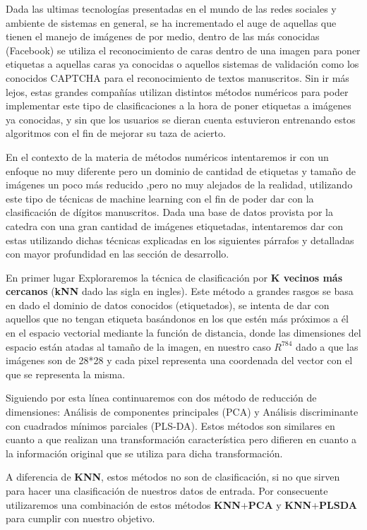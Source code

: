 Dada las ultimas tecnologías presentadas en el mundo de las redes sociales y ambiente de sistemas en general, se ha incrementado el auge de aquellas que tienen el manejo de imágenes de por medio, dentro de las más conocidas (Facebook) se utiliza el reconocimiento de caras dentro de una imagen para poner etiquetas a aquellas caras ya conocidas o aquellos sistemas de validación como los conocidos CAPTCHA para el reconocimiento de textos manuscritos. Sin ir más lejos, estas grandes compañías utilizan distintos métodos numéricos para poder implementar este tipo de clasificaciones a la hora de poner etiquetas a imágenes ya conocidas, y sin que los usuarios se dieran cuenta estuvieron entrenando estos algoritmos con el fin de mejorar su taza de acierto. 

En el contexto de la materia de métodos numéricos intentaremos ir con un enfoque no muy diferente pero un dominio de cantidad de etiquetas y tamaño de imágenes un poco más reducido ,pero no muy alejados de la realidad, utilizando este tipo de técnicas de machine learning con el fin de poder dar con la clasificación de dígitos manuscritos. Dada una base de datos provista por la catedra con una gran cantidad de imágenes etiquetadas, intentaremos dar con estas utilizando dichas técnicas explicadas en los siguientes párrafos y detalladas con mayor profundidad en las sección de desarrollo. 

En primer lugar Exploraremos la técnica de clasificación por \textbf{K vecinos más cercanos} (\textbf{kNN} dado las sigla en ingles). Este método a grandes rasgos se basa en dado el dominio de datos conocidos (etiquetados), se intenta de dar con aquellos que no tengan etiqueta basándonos en los que estén más próximos a él en el espacio vectorial mediante la función de distancia, donde las dimensiones del espacio están atadas al tamaño de la imagen, en nuestro caso $R^784$ dado a que las imágenes son de 28*28 y cada pixel representa una coordenada del vector con el que se representa la misma.

Siguiendo por esta línea continuaremos con dos método de reducción de dimensiones: Análisis de componentes principales (PCA) y Análisis discriminante con cuadrados mínimos parciales (PLS-DA). Estos métodos son similares en cuanto a que realizan una transformación característica pero difieren en cuanto a la información original que se utiliza para dicha transformación. 

A diferencia de \textbf{KNN}, estos métodos no son de clasificación, si no que sirven para hacer una clasificación de nuestros datos de entrada. Por consecuente utilizaremos una combinación de estos métodos \textbf{KNN}+\textbf{PCA} y \textbf{KNN}+\textbf{PLSDA} para cumplir con nuestro objetivo.

